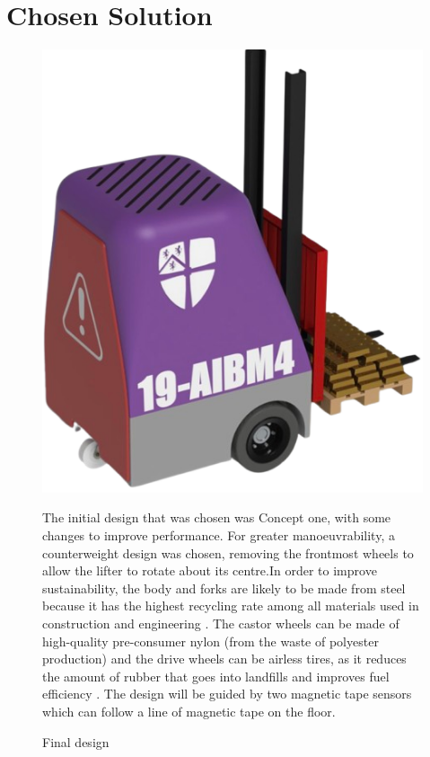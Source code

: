 \documentclass[12pt]{article}
\begin{document}
\section{Chosen Solution}
\begin{figure}[ht]

    \centering
    \begin{minipage}[b]{0.3\linewidth}
        \centering
        \includegraphics[width=.8\linewidth]{finaldesign1rb.png}  
        \caption{Final design}
        \label{fig:x}
    \end{minipage}%
    
    \begin{minipage}[b]{0.7\linewidth}
    \smallskip
        The initial design that was chosen was Concept one, with some changes to improve performance. For greater manoeuvrability, a counterweight design was chosen, removing the frontmost wheels to allow the lifter to rotate about its centre.In order to improve sustainability, the body and forks are likely to be made from steel because it has the highest recycling rate among all materials used in construction and engineering \cite{baker2023}. The castor wheels can be made of high-quality pre-consumer nylon (from the waste of polyester production) \cite{eco2022} and the drive wheels can be airless tires, as it reduces the amount of rubber that goes into landfills and improves fuel efficiency \cite{ImperialTyres}. The design will be guided by two magnetic tape sensors which can follow a line of magnetic tape on the floor.
    \end{minipage}
\end{figure}
\end{document}
